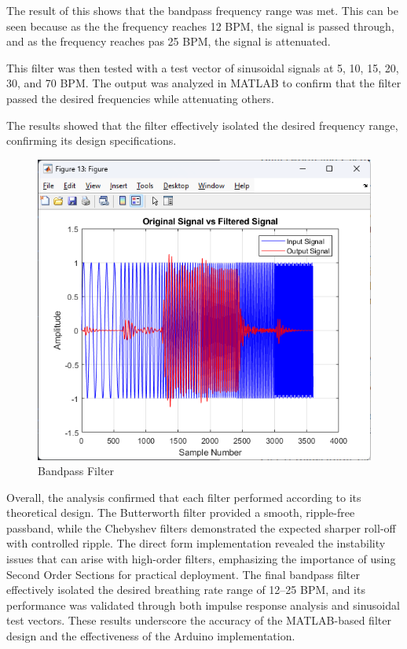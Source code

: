 \documentclass[journal]{IEEEtran}
\begin{document}
The result of this shows that the bandpass frequency range was met. This can be seen because as the the frequency reaches 12 BPM, the signal is passed through, and as the frequency reaches pas 25 BPM, the signal is attenuated.

This filter was then tested with a test vector of sinusoidal signals at 5, 10, 15, 20, 30, and 70 BPM. The output was analyzed in MATLAB to confirm that the filter passed the desired frequencies while attenuating others.

The results showed that the filter effectively isolated the desired frequency range, confirming its design specifications.

\begin{figure}[H]
    \centering
    \includegraphics[width=\linewidth]{plot7a.png}
    \caption{Bandpass Filter}
    \label{fig:5th_cheby_band_freq_final}
\end{figure}

Overall, the analysis confirmed that each filter performed according to its theoretical design. The Butterworth filter provided a smooth, ripple-free passband, while the Chebyshev filters demonstrated the expected sharper roll-off with controlled ripple. The direct form implementation revealed the instability issues that can arise with high-order filters, emphasizing the importance of using Second Order Sections for practical deployment. The final bandpass filter effectively isolated the desired breathing rate range of 12–25 BPM, and its performance was validated through both impulse response analysis and sinusoidal test vectors. These results underscore the accuracy of the MATLAB-based filter design and the effectiveness of the Arduino implementation.
\end{document}
